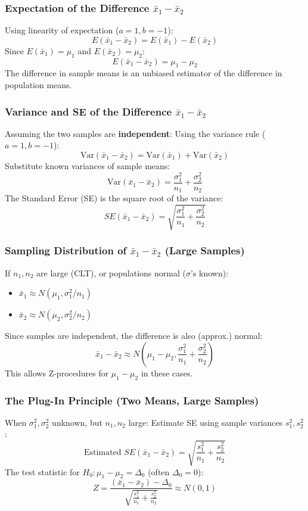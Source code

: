 \documentclass[handout]{beamer} %
\begin{document}
\begin{frame}
\frametitle{Expectation of the Difference \( \bar{x}_1 - \bar{x}_2 \)}
Using linearity of expectation (\(a=1, b=-1\)):
\[
E(\bar{x}_1 - \bar{x}_2) = E(\bar{x}_1) - E(\bar{x}_2)
\]
\pause
Since \(E(\bar{x}_1) = \mu_1\) and \(E(\bar{x}_2) = \mu_2\):
\[
E(\bar{x}_1 - \bar{x}_2) = \mu_1 - \mu_2
\]
\pause
The difference in sample means is an unbiased estimator of the difference in population means.
\end{frame}

\begin{frame}
\frametitle{Variance and SE of the Difference \( \bar{x}_1 - \bar{x}_2 \)}
Assuming the two samples are \textbf{independent}:
\pause
Using the variance rule (\(a=1, b=-1\)):
\[
\text{Var}(\bar{x}_1 - \bar{x}_2) = \text{Var}(\bar{x}_1) + \text{Var}(\bar{x}_2)
\]
\pause
Substitute known variances of sample means:
\[
\text{Var}(\bar{x}_1 - \bar{x}_2) = \frac{\sigma^2_1}{n_1} + \frac{\sigma^2_2}{n_2}
\]
\pause
The Standard Error (SE) is the square root of the variance:
\[
SE(\bar{x}_1 - \bar{x}_2) = \sqrt{\frac{\sigma^2_1}{n_1} + \frac{\sigma^2_2}{n_2}}
\]
\end{frame}

\begin{frame}
\frametitle{Sampling Distribution of \( \bar{x}_1 - \bar{x}_2 \) (Large Samples)}
If \( n_1, n_2 \) are large (CLT), or populations normal (\(\sigma\)'s known):
\begin{itemize}
    \item \(\bar{x}_1 \approx N(\mu_1, \sigma^2_1/n_1)\)
    \item \(\bar{x}_2 \approx N(\mu_2, \sigma^2_2/n_2)\)
\end{itemize}
\pause
Since samples are independent, the difference is also (approx.) normal:
\[
\bar{x}_1 - \bar{x}_2 \approx N\left(\mu_1 - \mu_2, \frac{\sigma^2_1}{n_1} + \frac{\sigma^2_2}{n_2}\right)
\]
\pause
This allows Z-procedures for \( \mu_1 - \mu_2 \) in these cases.
\end{frame}

\begin{frame}
\frametitle{The Plug-In Principle (Two Means, Large Samples)}
When \(\sigma^2_1, \sigma^2_2\) unknown, but \(n_1, n_2\) large:
Estimate SE using sample variances \(s^2_1, s^2_2\):
\[
\text{Estimated } SE(\bar{x}_1 - \bar{x}_2) = \sqrt{\frac{s^2_1}{n_1} + \frac{s^2_2}{n_2}}
\]
\pause
The test statistic for \(H_0: \mu_1 - \mu_2 = \Delta_0\) (often \(\Delta_0 = 0\)):
\[
Z = \frac{ (\bar{x}_1 - \bar{x}_2) - \Delta_0 }{ \sqrt{ \frac{s^2_1}{n_1} + \frac{s^2_2}{n_2}} } \approx N(0, 1)
\]
\end{frame}
\end{document}

